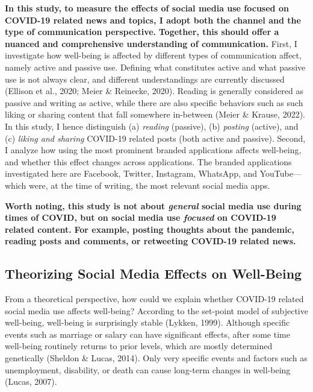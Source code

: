 \documentclass[
  man,mask]{apa7}
\begin{document}
\textbf{In this study, to measure the effects of social media use focused on COVID-19 related news and topics, I adopt both the channel and the type of communication perspective.}
\textbf{Together, this should offer a nuanced and comprehensive understanding of communication.}
First, I investigate how well-being is affected by different types of communication affect, namely active and passive use.
Defining what constitutes active and what passive use is not always clear, and different understandings are currently discussed (Ellison et al., 2020; Meier \& Reinecke, 2020).
Reading is generally considered as passive and writing as active, while there are also specific behaviors such as such liking or sharing content that fall somewhere in-between (Meier \& Krause, 2022).
In this study, I hence distinguish (a) \emph{reading} (passive), (b) \emph{posting} (active), and (c) \emph{liking and sharing} COVID-19 related posts (both active and passive).
Second, I analyze how using the most prominent branded applications affects well-being, and whether this effect changes across applications.
The branded applications investigated here are Facebook, Twitter, Instagram, WhatsApp, and YouTube---which were, at the time of writing, the most relevant social media apps.

\textbf{Worth noting, this study is not about \emph{general} social media use during times of COVID, but on social media use \emph{focused} on COVID-19 related content.}
\textbf{For example, posting thoughts about the pandemic, reading posts and comments, or retweeting COVID-19 related news.}

\hypertarget{theorizing-social-media-effects-on-well-being}{%
\subsection{Theorizing Social Media Effects on Well-Being}\label{theorizing-social-media-effects-on-well-being}}

From a theoretical perspective, how could we explain whether COVID-19 related social media use affects well-being?
According to the set-point model of subjective well-being, well-being is surprisingly stable (Lykken, 1999).
Although specific events such as marriage or salary can have significant effects, after some time well-being routinely returns to prior levels, which are mostly determined genetically (Sheldon \& Lucas, 2014).
Only very specific events and factors such as unemployment, disability, or death can cause long-term changes in well-being (Lucas, 2007).
\end{document}
